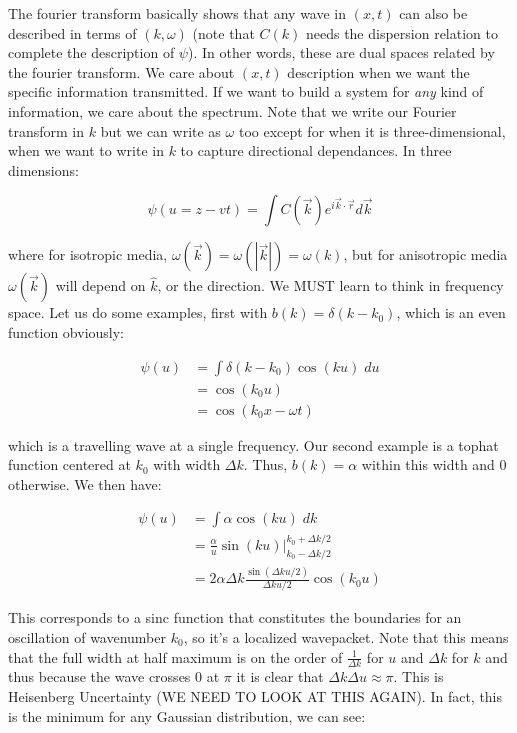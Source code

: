 \documentclass{report}
\begin{document}
The fourier transform basically shows that any wave in $(x,t)$ can also be described in terms of $(k,\omega)$ (note that $C(k)$ needs the dispersion relation to complete the description of $\psi$). In other words, these are dual spaces related by the fourier transform. We care about $(x,t)$ description when we want the specific information transmitted. If we want to build a system for \emph{any} kind of information, we care about the spectrum. Note that we write our Fourier transform in $k$ but we can write as $\omega$ too except for when it is three-dimensional, when we want to write in $k$ to capture directional dependances. In three dimensions:

$$\psi(u = z-vt) = \int C(\vec{k})e^{i\vec{k}\cdot \vec{r}} d\vec{k}$$

where for isotropic media, $\omega(\vec{k}) = \omega(|\vec{k}|) = \omega(k)$, but for anisotropic media $\omega(\vec{k})$ will depend on $\hat{k}$, or the direction. We MUST learn to think in frequency space. Let us do some examples, first with $b(k) = \delta(k-k_0)$, which is an even function obviously:

\begin{align*}
\psi(u) &= \int \delta(k-k_0)\cos(ku)\; du\\
&= \cos(k_0u)\\
&= \cos(k_0x - \omega t)
\end{align*}

which is a travelling wave at a single frequency. Our second example is a tophat function centered at $k_0$ with width $\Delta k$. Thus, $b(k) = \alpha$ within this width and $0$ otherwise. We then have:

\begin{align*}
\psi(u) &= \int{\alpha\cos(ku)\;dk}\\
&= \frac{\alpha}{u}\sin(ku)\bigg|_{k_0 - \Delta k/2}^{k_0 + \Delta k/2}\\
&= 2\alpha\Delta k \frac{\sin(\Delta k u/2)}{\Delta k u/2}\cos(k_0u)
\end{align*}

This corresponds to a sinc function that constitutes the boundaries for an oscillation of wavenumber $k_0$, so it's a localized wavepacket. Note that this means that the full width at half maximum is on the order of $\frac{1}{\Delta k}$ for $u$ and $\Delta k$ for $k$ and thus because the wave crosses $0$ at $\pi$ it is clear that $\Delta k \Delta u \approx \pi$. This is Heisenberg Uncertainty (WE NEED TO LOOK AT THIS AGAIN). In fact, this is the minimum for any Gaussian distribution, we can see:
\end{document}
